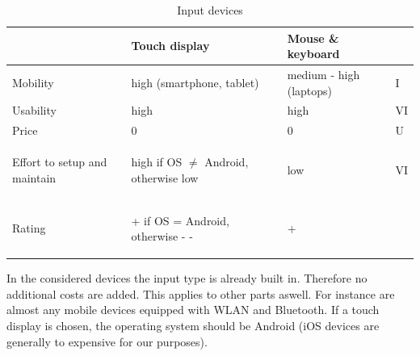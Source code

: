\documentclass[]{scrreprt}
\begin{document}
	\begin{table}[H]
		
		\centering
	\begin{tabular}{|l||l|l|l|}
		\hline 
		& Touch display & Mouse \& keyboard &\\ 
		\hline \hline
		Mobility & high (smartphone, tablet) & medium - high (laptops) & I\\ 
		\hline
		Usability & high & high & VI\\
		\hline
		Price & 0 & 0 & U\\
		\hline
		\begin{pbox}{2.5cm}{\vspace{.2\baselineskip}Effort to setup and maintain\vspace{.3\baselineskip}} \end{pbox}  &
		\begin{pbox}{4.0cm}{high if OS $\ne$ Android, otherwise low} \end{pbox}& \begin{pbox}{4.0cm}{low} \end{pbox} & VI\\
		\hline \hline
		Rating & \begin{pbox}{4.0cm}{\vspace{.2\baselineskip}+ if OS = Android, otherwise - -\vspace{.3\baselineskip}} \end{pbox} & + & \\
		\hline
	\end{tabular}
	\caption{Input devices} \label{tab:ID}
	\end{table}
	
	In the considered devices the input type is already built in. Therefore no additional costs are added. This applies to other parts aswell. For instance are almost any mobile devices equipped with WLAN and Bluetooth. If a touch display is chosen, the operating system should be Android (iOS devices are generally to expensive for our purposes). 
	
\end{document}
